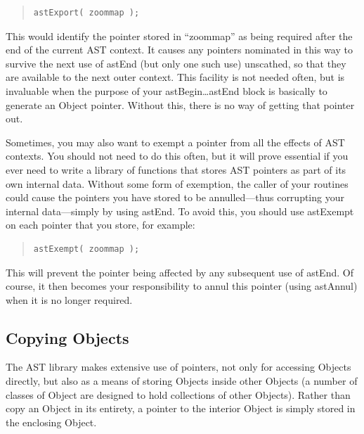 \documentclass[twoside,11pt]{article}
\newcommand{\htmlref}[2]{#1}
\begin{document}
\begin{quote}
\small
\begin{verbatim}
astExport( zoommap );
\end{verbatim}
\normalsize
\end{quote}

This would identify the pointer stored in ``zoommap'' as being required
after the end of the current AST context. It causes any pointers
nominated in this way to survive the next use of \htmlref{astEnd}{astEnd} (but only one
such use) unscathed, so that they are available to the next outer
context.  This facility is not needed often, but is invaluable when
the purpose of your \htmlref{astBegin}{astBegin}\ldots astEnd block is basically to
generate an \htmlref{Object}{Object} pointer. Without this, there is no way of getting
that pointer out.

Sometimes, you may also want to exempt a pointer from all the effects
of AST contexts. You should not need to do this often, but it will
prove essential if you ever need to write a library of functions that
stores AST pointers as part of its own internal data. Without some
form of exemption, the caller of your routines could cause the
pointers you have stored to be annulled---thus corrupting your
internal data---simply by using astEnd. To avoid this, you should use
\htmlref{astExempt}{astExempt} on each pointer that you store, for example:

\begin{quote}
\small
\begin{verbatim}
astExempt( zoommap );
\end{verbatim}
\normalsize
\end{quote}

This will prevent the pointer being affected by any subsequent use of
astEnd. Of course, it then becomes your responsibility to annul this
pointer (using \htmlref{astAnnul}{astAnnul}) when it is no longer required.

\subsection{\label{ss:copyingobjects}Copying Objects}

The AST library makes extensive use of pointers, not only for
accessing Objects directly, but also as a means of storing Objects
inside other Objects (a number of classes of \htmlref{Object}{Object} are designed to
hold collections of other Objects). Rather than copy an Object in its
entirety, a pointer to the interior Object is simply stored in the
enclosing Object.
\end{document}
